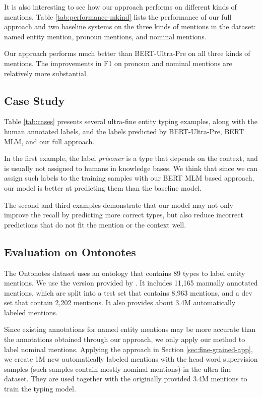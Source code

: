 \documentclass[11pt,a4paper]{article}
\begin{document}
It is also interesting to see how our approach performs on different kinds of mentions. 
Table \ref{tab:performance-mkind} lists the performance of our full approach and two baseline systems on the three kinds of mentions in the dataset: named entity mention, pronoun mentions, and nominal mentions.

Our approach performs much better than BERT-Ultra-Pre on all three kinds of mentions. The improvements in F1 on pronoun and nominal mentions are relatively more substantial.




\subsection{Case Study}

Table \ref{tab:cases} presents several ultra-fine entity typing examples, along with the human annotated labels, and the labels predicted by BERT-Ultra-Pre, BERT MLM, and our full approach.



In the first example, the label \textit{prisoner} is a type that depends on the context, and is usually not assigned to humans in knowledge bases. We think that since we can assign such labels to the training samples with our BERT MLM based approach, our model is better at predicting them than the baseline model.

The second and third examples demonstrate that our model may not only improve the recall by predicting more correct types, but also reduce incorrect predictions that do not fit the mention or the context well.

\subsection{Evaluation on Ontonotes}

The Ontonotes dataset uses an ontology that contains 89 types to label entity mentions. We use the version provided by \citet{choi2018ultra}. It includes 11,165 manually annotated mentions, which are split into a test set that contains 8,963 mentions, and a dev set that contain 2,202 mentions. It also provides about 3.4M automatically labeled mentions.

Since existing annotations for named entity mentions may be more accurate than the annotations obtained through our approach, we only apply our method to label nominal mentions. Applying the approach in Section \ref{sec:fine-grained-app}, we create 1M new automatically labeled mentions with the head word supervision samples (such samples contain mostly nominal mentions) in the ultra-fine dataset. They are used together with the originally provided 3.4M mentions to train the typing model.
\end{document}
